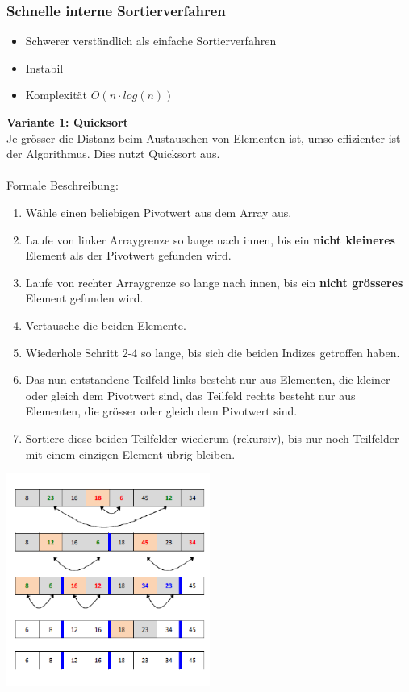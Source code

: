 \subsubsection{Schnelle interne Sortierverfahren}
\begin{itemize}
    \item Schwerer verständlich als einfache Sortierverfahren
    \item Instabil
    \item Komplexität $O(n\cdot log(n))$
\end{itemize}
\textbf{Variante 1: Quicksort}\\
Je grösser die Distanz beim Austauschen von Elementen ist, umso effizienter ist der Algorithmus. Dies nutzt Quicksort aus.\\\\
Formale Beschreibung:
\begin{enumerate}
\item Wähle einen beliebigen Pivotwert aus dem Array aus.
\item Laufe von linker Arraygrenze so lange nach innen, bis ein \textbf{nicht kleineres}
Element als der Pivotwert gefunden wird.
\item Laufe von rechter Arraygrenze so lange nach innen, bis ein \textbf{nicht grösseres} Element gefunden wird.
\item Vertausche die beiden Elemente.
\item Wiederhole Schritt 2-4 so lange, bis sich die beiden Indizes getroffen haben.
\item Das nun entstandene Teilfeld links besteht nur aus Elementen, die kleiner oder gleich dem Pivotwert sind, das Teilfeld rechts besteht nur aus Elementen, die grösser oder gleich dem Pivotwert sind.
\item Sortiere diese beiden Teilfelder wiederum (rekursiv), bis nur noch Teilfelder mit einem einzigen Element übrig bleiben.
\end{enumerate}
\begin{multicols}{2}

\includegraphics[width=0.5\textwidth]{images/Algorithmen/Quicksort.png} \ \\ \ \\
\end{multicols}
